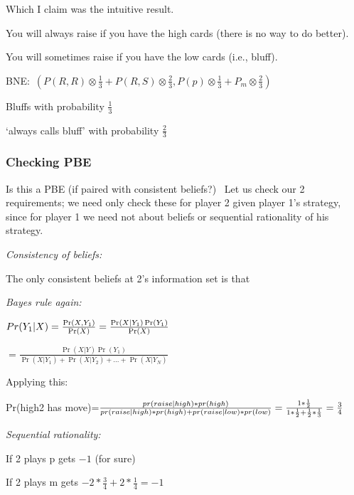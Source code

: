 \documentclass{article}
\begin{document}
\bigskip

Which I claim was the intuitive result. \

\bigskip

You will always raise if you have the high cards (there is no way to do
better).

You will sometimes raise if you have the low cards (i.e., bluff).

\bigskip

BNE:\ $(P(R,R)\otimes \frac{1}{3}+P(R,S)\otimes \frac{2}{3},P(p)\otimes
\frac{1}{3}+P_{m}\otimes \frac{2}{3})$

Bluffs with probability $\frac{1}{3}$

`always calls bluff' with probability $\frac{2}{3}$

\bigskip

\subsubsection{Checking PBE}

Is this a PBE (if paired with consistent beliefs?) \ Let us check our 2
requirements; we need only check these for player 2 given player 1's
strategy, since for player 1 we need not about beliefs or sequential
rationality of his strategy.

\bigskip

\textit{Consistency of beliefs:}

The only consistent beliefs at 2's information set is that

\bigskip

\textit{Bayes rule again: }

$Pr(Y_{1}|X)=\frac{\Pr (X,Y_{1})}{\Pr (X)}=\frac{\Pr (X|Y_{1})\Pr (Y_{1})}{%
\Pr (X)}$

$=\frac{\Pr (X|Y)\Pr (Y_{1})}{\Pr (X|Y_{1})+\Pr (X|Y_{2})+...+\Pr (X|Y_{N})}$

\bigskip

Applying this:

Pr(high\TEXTsymbol{\vert}2 has move)=$\frac{pr(raise|high)\ast pr(high)}{%
pr(raise|high)\ast pr(high)+pr(raise|low)\ast pr(low)}=\frac{1\ast \frac{1}{2%
}}{1\ast \frac{1}{2}+\frac{1}{2}\ast \frac{1}{3}}=\allowbreak \frac{3}{4}$

\textit{Sequential rationality:\ }

If 2 plays p gets $-1$ (for sure)

If 2 plays m gets $-2\ast \frac{3}{4}+2\ast \frac{1}{4}=\allowbreak -1$

\bigskip
\end{document}
